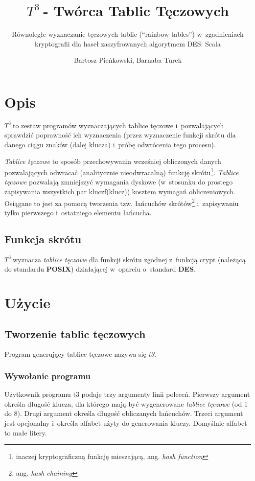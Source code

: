 \documentclass[a4paper]{scrartcl}
\begin{document}
\sloppy

\newcommand{\ttt}{$T^3\:$}

\title{\ttt - Twórca Tablic Tęczowych}
\subtitle{Równoległe wyznaczanie tęczowych tablic (``rainbow tables'') w~zgadnieniach kryptografii dla haseł zaszyfrowanych algorytmem DES: Scala}
\author{Bartosz Pieńkowski, Barnaba Turek}
\maketitle
\section{Opis}
\ttt to zestaw programów wyznaczających tablice tęczowe i~pozwalających sprawdzić poprawność ich wyznaczenia (przez wyznaczenie funkcji skrótu dla danego ciągu znaków (dalej klucza) i~próbę odwrócenia tego procesu).

\emph{Tablice tęczowe} to sposób przechowywania wcześniej obliczonych danych pozwalających odwracać (analitycznie nieodwracalną) funkcję skrótu\footnote{inaczej kryptograficzną funkcję mieszającą, ang. \emph{hash function}}.
\emph{Tablice tęczowe} pozwalają zmniejszyć wymagania dyskowe (w~stosunku do prostego zapisywania wszystkich par klucz\dywiz f(klucz)) kosztem wymagań obliczeniowych.
Osiągane to jest za pomocą tworzenia tzw. łańcuchów skrótów\footnote{ang. \emph{hash chaining}} i~zapisywaniu tylko pierwszego i~ostatniego elementu łańcucha.

\subsection{Funkcja skrótu}
\ttt wyznacza \emph{tablice tęczowe} dla funkcji skrótu zgodnej z~funkcją crypt (należącą do standardu \textbf{POSIX}) działającej w~oparciu o~standard \textbf{DES}.

\section{Użycie}
\subsection{Tworzenie tablic tęczowych}
Program generujący tablice tęczowe nazywa się \emph{t3}.

\subsubsection{Wywołanie programu}
Użytkownik programu t3 podaje trzy argumenty linii poleceń. Pierwszy argument określa długość klucza, dla którego mają być wygenerowane \emph{tablice tęczowe} (od 1 do 8).
Drugi argument określa długość obliczanych łańcuchów.
Trzeci argument jest opcjonalny i~określa alfabet użyty do generowania kluczy. Domyślnie alfabet to małe litery.
\end{document}
